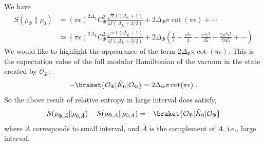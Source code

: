 \documentclass[11pt]{article}
\newcommand{\ep}{\epsilon}
\newcommand{\p}{\partial}
\newcommand{\mO}{\mathcal{O}}
\newcommand{\nn}{\nonumber}
\newcommand{\lb}{\left(}
\newcommand{\rb}{\right)}
\begin{document}
We have
\begin{align}
  S(\rho_\Phi\|\rho_0)&=(\pi \ep)^{2\Delta_L}C_{\Phi}^2\frac{\sqrt{\pi}\Gamma(\Delta_L+1)}{4\Gamma(\Delta_L+3/2)} + 2\Delta_\Phi \pi \cot(\pi \ep) + \cdots \nn \\ 
&\simeq (\pi \ep)^{2\Delta_L}C_{\Phi}^2\frac{\sqrt{\pi}\Gamma(\Delta_L+1)}{4\Gamma(\Delta_L+3/2)}  +2\Delta_\Phi\lb \frac{1}{\ep} - \frac{\pi^2 \ep}{3} - \frac{\pi^4 \ep^3}{45} - \frac{2\pi^6 \ep^5}{945} + \cdots\rb 
\end{align}
We would like to highlight the appearance of the term $2\Delta_\Phi\pi \cot(\pi \ep)$. This is the expectation value of the full modular Hamiltonian of the vacuum in the state created by $\mO_{L}$:
\begin{align}
    -\braket{\mO_\Phi|\hat{K}_0|\mO_\Phi}=2\Delta_\Phi\pi\cot(\pi \ep)\ .
\end{align}
So the above result of relative entropy in large interval does satisfy,
\begin{align}
    S(\rho_{\Phi,\bar{A}}\|\rho_{0,\bar{A}}) - S(\rho_{\Phi,A}\|\rho_{0,A}) = -\braket{\mO_\Phi|\hat{K}_0|\mO_\Phi}
\end{align}
where $A$ corresponds to small interval, and $\bar{A}$ is the complement of $A$, i.e., large interval. 
\end{document}
